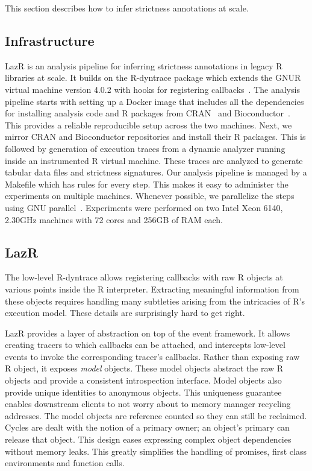 \documentclass[review,nonacm,screen,acmsmall,anonymous=true]{acmart}
\newcommand{\rdyn}{{\sf R-dyntrace}\xspace}
\newcommand{\lazr}{{\sf LazR}\xspace}
\begin{document}
This section describes how to infer strictness annotations at scale.

\subsection{Infrastructure}

\lazr is an analysis pipeline for inferring strictness annotations in legacy R
libraries at scale. It builds on the \rdyn package which extends the GNUR
virtual machine version 4.0.2 with hooks for registering
callbacks~\cite{oopsla19b}. The analysis pipeline starts with setting up a
Docker image that includes all the dependencies for installing analysis code and
R packages from CRAN~\cite{ligges2017} and Bioconductor~\cite{bioc}. This
provides a reliable reproducible setup across the two machines. Next, we mirror
CRAN and Bioconductor repositories and install their R packages. This is
followed by generation of execution traces from a dynamic analyzer running
inside an instrumented R virtual machine. These traces are analyzed to generate
tabular data files and strictness signatures. Our analysis pipeline is managed
by a Makefile which has rules for every step. This makes it easy to administer
the experiments on multiple machines. Whenever possible, we parallelize the
steps using GNU parallel~\cite{tange2011a}. Experiments were performed on two
Intel Xeon 6140, 2.30GHz machines with 72 cores and 256GB of RAM each.

\subsection{LazR} \label{subsection:lazr}

The low-level \rdyn allows registering callbacks with raw R objects at various
points inside the R interpreter. Extracting meaningful information from these
objects requires handling many subtleties arising from the intricacies of R's
execution model. These details are surprisingly hard to get right.

\lazr provides a layer of abstraction on top of the event framework. It allows
creating tracers to which callbacks can be attached, and intercepts low-level
events to invoke the corresponding tracer's callbacks. Rather than exposing raw
R object, it exposes \emph{model} objects. These model objects abstract the raw
R objects and provide a consistent introspection interface. Model objects also
provide unique identities to anonymous objects. This uniqueness guarantee
enables downstream clients to not worry about to memory manager recycling
addresses. The model objects are reference counted so they can still be
reclaimed. Cycles are dealt with the notion of a primary owner; an object's
primary can release that object. This design eases expressing complex object
dependencies without memory leaks. This greatly simplifies the handling of
promises, first class environments and function calls.
\end{document}
